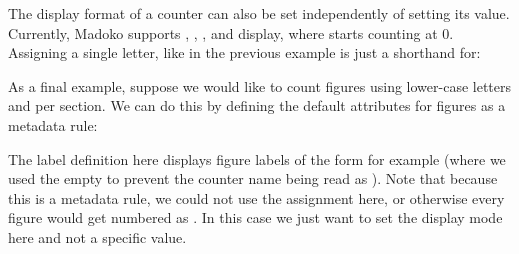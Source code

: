 \documentclass{book}
\begin{document}
\begin{mdP}[data-line={2791}]%
{}The display format of a counter can also be set independently of setting its
value. Currently, Madoko supports %
{}%
{}, %
{}%
{}, %
{}%
{}, and %
{}%
{}
display, where %
{}%
{} starts counting at 0. 
Assigning a single letter, like %
{}%
{} in the previous example is
just a shorthand for:%
\end{mdP}%
\begin{mdPre}[class={para-block,pre-indented,language-madoko,lang-madoko,madoko,highlighted},language={madoko},data-line={2797}]%
%
\end{mdPre}%
\begin{mdP}[data-line={2799}]%
{}As a final example, suppose we would like to count figures using  lower-case
letters and per section. We can do this by defining the default attributes for
figures as a metadata rule:%
\end{mdP}%
\begin{mdPre}[class={para-block,pre-indented,language-madoko,lang-madoko,madoko,highlighted},language={madoko},data-line={2803}]%
%
\end{mdPre}%
\begin{mdP}[data-line={2805}]%
{}The label definition here displays figure labels of the form %
{}%
{} for example
(where we used the empty%
{}{\mdNbsp}%
{} %
{}\mdCode[class={code,code1}]{{\textbackslash}/}%
{} to prevent the
counter name %
{}%
{}  being read as %
{}%
{}). Note that because this is a
metadata rule, we could not  use the assignment %
{}%
{} here, or
otherwise every figure would get numbered as %
{}%
{}. In this case we just want to
set the display mode here and not a specific value.%
\end{mdP}%
\end{document}
